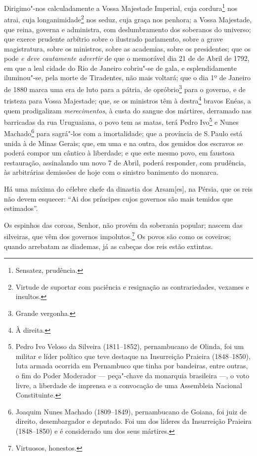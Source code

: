 Dirigimo"-nos calculadamente a Vossa Majestade Imperial, cuja
cordura\footnote{Sensatez, prudência.} nos atrai, cuja
longanimidade\footnote{Virtude de suportar com paciência e resignação
  as contrariedades, vexames e insultos.} nos seduz, cuja graça nos
penhora; a Vossa Majestade, que reina, governa e administra, com
deslumbramento dos soberanos do universo; que exerce prudente arbítrio
sobre o ilustrado parlamento, sobre a grave magistratura, sobre os
ministros, sobre as academias, sobre os presidentes; que os pode \emph{e
deve cautamente advertir} de que o memorável dia 21 de de Abril de 1792,
em que a leal cidade do Rio de Janeiro cobriu"-se de gala, e
esplendidamente iluminou"-se, pela morte de Tiradentes, não mais voltará;
que o dia 1º de Janeiro de 1880 marca uma era de luto para a pátria, de
opróbrio\footnote{Grande vergonha.} para o governo, e de tristeza para
Vossa Majestade; que, se os ministros têm à destra\footnote{À direita.}
bravos Enéas, a quem prodigalizam \emph{merecimentos}, à custa do sangue
dos mártires, derramado nas barricadas da rua Uruguaiana, o povo tem as
matas, terá Pedro Ivo\footnote{Pedro Ivo Veloso da Silveira
  (1811--1852), pernambucano de Olinda, foi um militar e líder político
  que teve destaque na Insurreição Praieira (1848--1850), luta armada
  ocorrida em Pernambuco que tinha por bandeiras, entre outras, o fim do
  Poder Moderador --- peça"-chave da monarquia brasileira ---, o voto livre,
  a liberdade de imprensa e a convocação de uma Assembleia Nacional
  Constituinte.} e Nunes Machado\footnote{Joaquim Nunes Machado
  (1809--1849), pernambucano de Goiana, foi juiz de direito,
  desembargador e deputado. Foi um dos líderes da Insurreição Praieira
  (1848--1850) e é considerado um dos seus mártires.} para sagrá"-los com
a imortalidade; que a província de S.\,Paulo está unida à de Minas
Gerais; que, em uma e na outra, dos gemidos dos escravos se poderá
compor um cântico à liberdade; e que este mesmo povo, em faustosa
restauração, assinalando um novo 7 de Abril, poderá responder, com
prudência, às arbitrárias demissões de hoje com o sinistro banimento do
monarca.

Há uma máxima do célebre chefe da dinastia dos Arsam{[}es{]}, na Pérsia,
que os reis não devem esquecer: ``Ai dos príncipes cujos governos são
mais temidos que estimados''.

Os espinhos das coroas, Senhor, não provém da soberania popular; nascem
das silveiras, que vêm dos governos impolutos.\footnote{Virtuosos,
  honestos.} Os povos são como os coveiros; quando arrebatam as
diademas, já as cabeças dos reis estão extintas.

